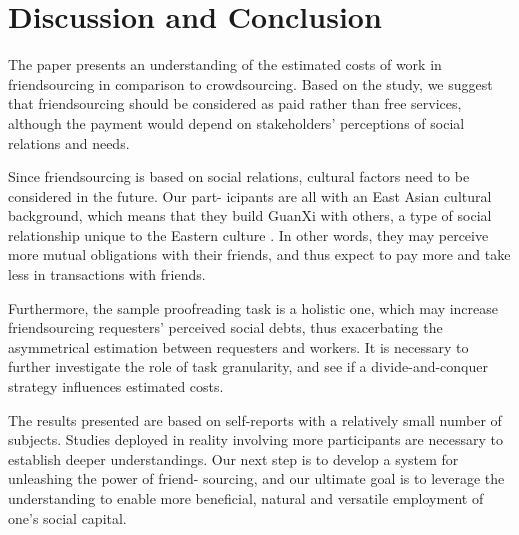 \section{Discussion and Conclusion}
The paper presents an understanding of the estimated costs of work in friendsourcing in comparison to crowdsourcing. 
Based on the study, we suggest that friendsourcing should be considered as paid rather than free services, 
although the payment would depend on stakeholders' perceptions of social relations and needs. 

Since friendsourcing is based on social relations, cultural factors need to be considered in the future. 
Our part- icipants are all with an East Asian cultural background, which means that they build GuanXi with others, 
a type of social relationship unique to the Eastern culture \cite{Fan:InterBusinessReview02:GunaXiDef}. 
In other words, they may perceive more mutual obligations with their friends, 
and thus expect to pay more and take less in transactions with friends.
 
Furthermore, the sample proofreading task is a holistic one, 
which may increase friendsourcing requesters' perceived social debts, 
thus exacerbating the asymmetrical estimation between requesters and workers. 
It is necessary to further investigate the role of task granularity, 
and see if a divide-and-conquer strategy influences estimated costs.

The results presented are based on self-reports with a relatively small number of subjects. 
Studies deployed in reality involving more participants are necessary to establish deeper understandings. 
Our next step is to develop a system for unleashing the power of friend- sourcing, 
and our ultimate goal is to leverage the understanding to enable more beneficial, 
natural and versatile employment of one's social capital.



%
%
%
%
%


